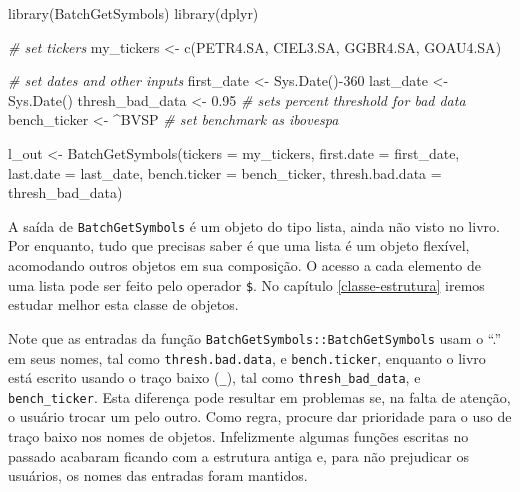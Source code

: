 \documentclass[
  11pt,
]{book}
\newenvironment{Shaded}{\begin{snugshade}}{\end{snugshade}}
\newcommand{\AttributeTok}[1]{\textcolor[rgb]{0.61,0.61,0.61}{#1}}
\newcommand{\CommentTok}[1]{\textcolor[rgb]{0.37,0.37,0.37}{\textit{#1}}}
\newcommand{\DecValTok}[1]{\textcolor[rgb]{0.06,0.06,0.06}{#1}}
\newcommand{\FloatTok}[1]{\textcolor[rgb]{0.06,0.06,0.06}{#1}}
\newcommand{\FunctionTok}[1]{\textcolor[rgb]{0,0,0}{#1}}
\newcommand{\NormalTok}[1]{#1}
\newcommand{\OtherTok}[1]{\textcolor[rgb]{0.37,0.37,0.37}{#1}}
\newcommand{\SpecialCharTok}[1]{\textcolor[rgb]{0,0,0}{#1}}
\newcommand{\StringTok}[1]{\textcolor[rgb]{0.5,0.5,0.5}{#1}}
\newenvironment{rmdcaution}
{\begin{cautionblock}

} {\end{cautionblock}}
\begin{document}
\begin{Shaded}
\begin{Highlighting}[]
\FunctionTok{library}\NormalTok{(BatchGetSymbols)}
\FunctionTok{library}\NormalTok{(dplyr)}

\CommentTok{\# set tickers}
\NormalTok{my\_tickers }\OtherTok{\textless{}{-}} \FunctionTok{c}\NormalTok{(}\StringTok{\textquotesingle{}PETR4.SA\textquotesingle{}}\NormalTok{, }\StringTok{\textquotesingle{}CIEL3.SA\textquotesingle{}}\NormalTok{,}
                \StringTok{\textquotesingle{}GGBR4.SA\textquotesingle{}}\NormalTok{, }\StringTok{\textquotesingle{}GOAU4.SA\textquotesingle{}}\NormalTok{)}

\CommentTok{\# set dates and other inputs}
\NormalTok{first\_date }\OtherTok{\textless{}{-}} \FunctionTok{Sys.Date}\NormalTok{()}\SpecialCharTok{{-}}\DecValTok{360}
\NormalTok{last\_date }\OtherTok{\textless{}{-}} \FunctionTok{Sys.Date}\NormalTok{()}
\NormalTok{thresh\_bad\_data }\OtherTok{\textless{}{-}} \FloatTok{0.95}   \CommentTok{\# sets percent threshold for bad data}
\NormalTok{bench\_ticker }\OtherTok{\textless{}{-}} \StringTok{\textquotesingle{}\^{}BVSP\textquotesingle{}}   \CommentTok{\# set benchmark as ibovespa}

\NormalTok{l\_out }\OtherTok{\textless{}{-}} \FunctionTok{BatchGetSymbols}\NormalTok{(}\AttributeTok{tickers =}\NormalTok{ my\_tickers,}
                         \AttributeTok{first.date =}\NormalTok{ first\_date,}
                         \AttributeTok{last.date =}\NormalTok{ last\_date,}
                         \AttributeTok{bench.ticker =}\NormalTok{ bench\_ticker,}
                         \AttributeTok{thresh.bad.data =}\NormalTok{ thresh\_bad\_data)}
\end{Highlighting}
\end{Shaded}

A saída de \texttt{BatchGetSymbols} é um objeto do tipo lista, ainda não visto no livro. Por enquanto, tudo que precisas saber é que uma lista é um objeto flexível, acomodando outros objetos em sua composição. O acesso a cada elemento de uma lista pode ser feito pelo operador \texttt{\$}. No capítulo \ref{classe-estrutura} iremos estudar melhor esta classe de objetos.

\begin{rmdcaution}
Note que as entradas da função \texttt{BatchGetSymbols::BatchGetSymbols}
usam o ``.'' em seus nomes, tal como \texttt{thresh.bad.data}, e
\texttt{bench.ticker}, enquanto o livro está escrito usando o traço
baixo (\texttt{\_}), tal como \texttt{thresh\_bad\_data}, e
\texttt{bench\_ticker}. Esta diferença pode resultar em problemas se, na
falta de atenção, o usuário trocar um pelo outro. Como regra, procure
dar prioridade para o uso de traço baixo nos nomes de objetos.
Infelizmente algumas funções escritas no passado acabaram ficando com a
estrutura antiga e, para não prejudicar os usuários, os nomes das
entradas foram mantidos.
\end{rmdcaution}
\end{document}
